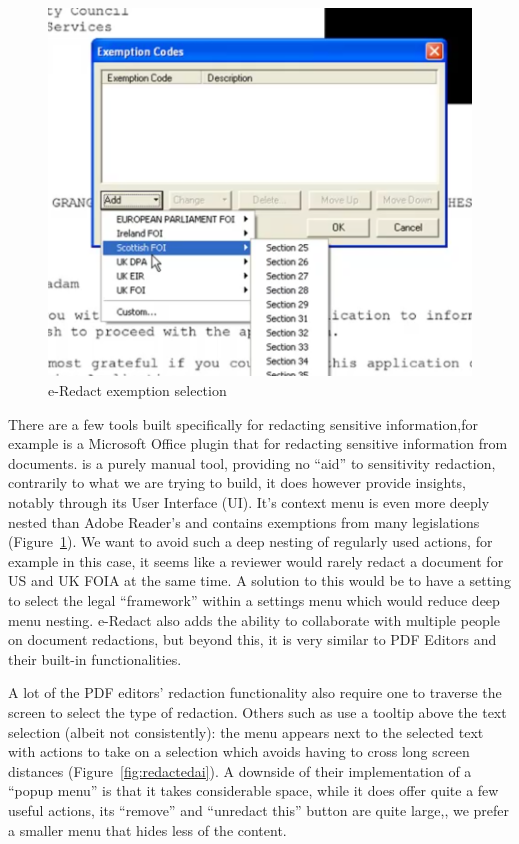 \documentclass[\version]{l4proj}
\begin{document}
\begin{figure}
    \includegraphics[width=\linewidth]{images/related_products/eredact_dropdown.png}
    \caption{e-Redact exemption selection}\label{fig:eredact-dropdown}
    \vspace{-17pt}
\end{figure}

There are a few tools built specifically for redacting sensitive information,for example \textcite{ERedact} is a Microsoft Office plugin that for redacting sensitive information from documents.
\textcite{ERedact} is a purely manual tool, providing no ``aid'' to sensitivity redaction, contrarily to what we are trying to build, it does however provide insights, notably through its User Interface (UI).
It's context menu is even more deeply nested than Adobe Reader's and contains exemptions from many legislations (Figure~\ref{fig:eredact-dropdown}).
We want to avoid such a deep nesting of regularly used actions, for example in this case, it seems like a reviewer would rarely redact a document for US and UK FOIA at the same time.
A solution to this would be to have a setting to select the legal ``framework'' within a settings menu which would reduce deep menu nesting.
e-Redact also adds the ability to collaborate with multiple people on document redactions, but beyond this, it is very similar to PDF Editors and their built-in functionalities.

A lot of the PDF editors' redaction functionality also require one to traverse the screen to select the type of redaction.
Others such as \textcite{RedactedAIRemovea} use a tooltip above the text selection (albeit not consistently): the menu appears next to the selected text with actions to take on a selection which avoids having to cross long screen distances (Figure~\ref{fig:redactedai}).
A downside of their implementation of a ``popup menu'' is that it takes considerable space, while it does offer quite a few useful actions, its ``remove'' and ``unredact this'' button are quite large,, we prefer a smaller menu that hides less of the content.
\end{document}
